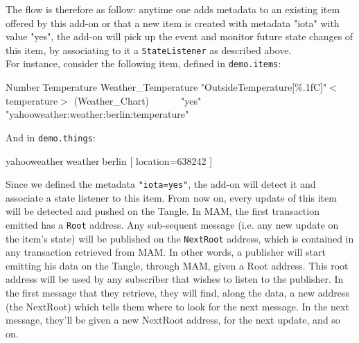 \documentclass[a4paper,10pt]{article}
\begin{document}
\noindent The flow is therefore as follow: anytime one adds metadata to an existing item offered by this add-on or that a new item is created with metadata "iota" with value "yes", the add-on will pick up the event and monitor future state changes of this item, by associating to it a \texttt{StateListener} as described above. \\

\noindent For instance, consider the following item, defined in \texttt{demo.items}:

\begin{center}
\begin{tcolorbox}
\textcolor{TypeItem}{Number}\textcolor{white}{:}\textcolor{TypeItem}{Temperature} \textcolor{NameItem}{Weather\_Temperature} \textcolor{DescriptionItem}{"OutsideTemperature[\%.1f\degree C]"}\textcolor{GroupItem}{$<$temperature$>$} \textcolor{FuncItem}{(Weather\_Chart)} \textcolor{white}{\{iota=}\textcolor{DescriptionItem}{"yes"}\textcolor{white}{,} \textcolor{white}{channel=} \textcolor{DescriptionItem}{"yahooweather:weather:berlin:temperature"} \textcolor{white}{\}}
\end{tcolorbox}
\end{center}

\noindent And in \texttt{demo.things}:

\begin{center}
\begin{tcolorbox}
\textcolor{TypeItem}{yahooweather}\textcolor{white}{:}\textcolor{TypeItem}{weather}\textcolor{white}{:}\textcolor{NameItem}{berlin} \textcolor{GroupItem}{[ location=638242 ]}
\end{tcolorbox}
\end{center}

\noindent Since we defined the metadata \texttt{"iota=yes"}, the add-on will detect it and associate a state listener to this item. From now on, every update of this item will be detected and pushed on the Tangle. In MAM, the first transaction emitted has a \texttt{Root} address. Any sub-sequent message (i.e. any new update on the item's state) will be published on the \texttt{NextRoot} address, which is contained in any transaction retrieved from MAM. In other words, a publisher will start emitting his data on the Tangle, through MAM, given a Root address. This root address will be used by any subscriber that wishes to listen to the publisher. In the first message that they retrieve, they will find, along the data, a new address (the NextRoot) which tells them where to look for the next message. In the next message, they'll be given a new NextRoot address, for the next update, and so on.
\end{document}
